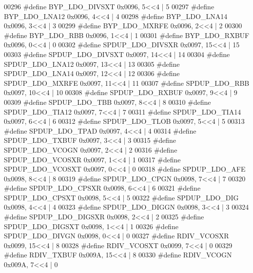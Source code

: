 \begin{DoxyCode}
00296 \textcolor{preprocessor}{#define BYP\_LDO\_DIVSXT 0x0096, 5<<4 |  5}
00297 \textcolor{preprocessor}{#define BYP\_LDO\_LNA12 0x0096, 4<<4 |  4}
00298 \textcolor{preprocessor}{#define BYP\_LDO\_LNA14 0x0096, 3<<4 |  3}
00299 \textcolor{preprocessor}{#define BYP\_LDO\_MXRFE 0x0096, 2<<4 |  2}
00300 \textcolor{preprocessor}{#define BYP\_LDO\_RBB 0x0096, 1<<4 |  1}
00301 \textcolor{preprocessor}{#define BYP\_LDO\_RXBUF 0x0096, 0<<4 |  0}
00302 \textcolor{preprocessor}{#define SPDUP\_LDO\_DIVSXR 0x0097, 15<<4 |  15}
00303 \textcolor{preprocessor}{#define SPDUP\_LDO\_DIVSXT 0x0097, 14<<4 |  14}
00304 \textcolor{preprocessor}{#define SPDUP\_LDO\_LNA12 0x0097, 13<<4 |  13}
00305 \textcolor{preprocessor}{#define SPDUP\_LDO\_LNA14 0x0097, 12<<4 |  12}
00306 \textcolor{preprocessor}{#define SPDUP\_LDO\_MXRFE 0x0097, 11<<4 |  11}
00307 \textcolor{preprocessor}{#define SPDUP\_LDO\_RBB 0x0097, 10<<4 |  10}
00308 \textcolor{preprocessor}{#define SPDUP\_LDO\_RXBUF 0x0097, 9<<4 |  9}
00309 \textcolor{preprocessor}{#define SPDUP\_LDO\_TBB 0x0097, 8<<4 |  8}
00310 \textcolor{preprocessor}{#define SPDUP\_LDO\_TIA12 0x0097, 7<<4 |  7}
00311 \textcolor{preprocessor}{#define SPDUP\_LDO\_TIA14 0x0097, 6<<4 |  6}
00312 \textcolor{preprocessor}{#define SPDUP\_LDO\_TLOB 0x0097, 5<<4 |  5}
00313 \textcolor{preprocessor}{#define SPDUP\_LDO\_TPAD 0x0097, 4<<4 |  4}
00314 \textcolor{preprocessor}{#define SPDUP\_LDO\_TXBUF 0x0097, 3<<4 |  3}
00315 \textcolor{preprocessor}{#define SPDUP\_LDO\_VCOGN 0x0097, 2<<4 |  2}
00316 \textcolor{preprocessor}{#define SPDUP\_LDO\_VCOSXR 0x0097, 1<<4 |  1}
00317 \textcolor{preprocessor}{#define SPDUP\_LDO\_VCOSXT 0x0097, 0<<4 |  0}
00318 \textcolor{preprocessor}{#define SPDUP\_LDO\_AFE 0x0098, 8<<4 |  8}
00319 \textcolor{preprocessor}{#define SPDUP\_LDO\_CPGN 0x0098, 7<<4 |  7}
00320 \textcolor{preprocessor}{#define SPDUP\_LDO\_CPSXR 0x0098, 6<<4 |  6}
00321 \textcolor{preprocessor}{#define SPDUP\_LDO\_CPSXT 0x0098, 5<<4 |  5}
00322 \textcolor{preprocessor}{#define SPDUP\_LDO\_DIG 0x0098, 4<<4 |  4}
00323 \textcolor{preprocessor}{#define SPDUP\_LDO\_DIGGN 0x0098, 3<<4 |  3}
00324 \textcolor{preprocessor}{#define SPDUP\_LDO\_DIGSXR 0x0098, 2<<4 |  2}
00325 \textcolor{preprocessor}{#define SPDUP\_LDO\_DIGSXT 0x0098, 1<<4 |  1}
00326 \textcolor{preprocessor}{#define SPDUP\_LDO\_DIVGN 0x0098, 0<<4 |  0}
00327 \textcolor{preprocessor}{#define RDIV\_VCOSXR 0x0099, 15<<4 |  8}
00328 \textcolor{preprocessor}{#define RDIV\_VCOSXT 0x0099, 7<<4 |  0}
00329 \textcolor{preprocessor}{#define RDIV\_TXBUF 0x009A, 15<<4 |  8}
00330 \textcolor{preprocessor}{#define RDIV\_VCOGN 0x009A, 7<<4 |  0}

\end{DoxyCode}
